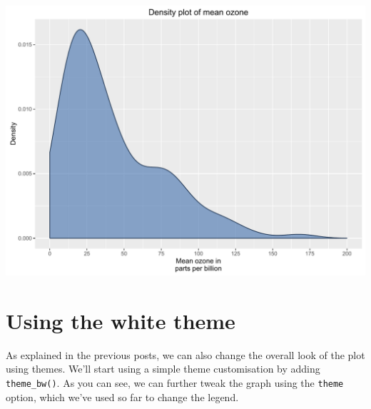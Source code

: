 \begin{Shaded}
\begin{Highlighting}[]
\StringTok{ }\NormalTok{(} \StringTok{ }
\StringTok{      }\NormalTok{(}  
\StringTok{        } \NormalTok{) +}
\StringTok{      }\NormalTok{(} \NormalTok{,}
\StringTok{        } \NormalTok{(}\NormalTok{, }\NormalTok{, }\NormalTok{),}
\StringTok{        }\NormalTok{(}\NormalTok{, }\NormalTok{)) +}
\StringTok{      }\NormalTok{(} \NormalTok{) +}
\StringTok{      }\NormalTok{(}\NormalTok{)}
\end{Highlighting}
\end{Shaded}

\begin{center}\includegraphics[width=0.55\linewidth]{figures/density_8-1} \end{center}

\section{Using the white theme}\label{using-the-white-theme-7}

As explained in the previous posts, we can also change the overall look
of the plot using themes. We'll start using a simple theme customisation
by adding \texttt{theme\_bw()}. As you can see, we can further tweak the
graph using the \texttt{theme} option, which we've used so far to change
the legend.

